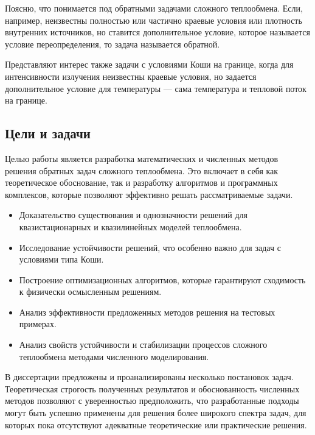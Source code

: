 \documentclass[8pt,a4paper]{article}
\begin{document}
    Поясню, что понимается под обратными задачами сложного теплообмена.
    Если, например, неизвестны полностью или частично краевые условия или плотность внутренних источников,
    но ставится дополнительное условие, которое называется условие переопределения,
    то задача называется обратной.

    Представляют интерес также задачи с условиями Коши на границе, когда для интенсивности
    излучения неизвестны краевые условия, но задается дополнительное условие для температуры ---
    сама температура и тепловой поток на границе.

    \subsection*{Цели и задачи}
    Целью работы является разработка математических
    и численных методов решения обратных задач сложного теплообмена.
    Это включает в себя как теоретическое обоснование,
    так и разработку алгоритмов и программных комплексов,
    которые позволяют эффективно решать рассматриваемые задачи.
    \begin{itemize}
        \item Доказательство существования и однозначности решений для квазистационарных и квазилинейных моделей теплообмена.
        \item Исследование устойчивости решений, что особенно важно для задач с условиями типа Коши.
        \item Построение оптимизационных алгоритмов, которые гарантируют сходимость к физически осмысленным решениям.
        \item Анализ эффективности предложенных методов решения на тестовых примерах.
        \item Анализ свойств устойчивости и стабилизации процессов сложного теплообмена методами численного моделирования.
    \end{itemize}


    В диссертации предложены и проанализированы несколько постановок задач.
    Теоретическая строгость полученных результатов и обоснованность численных методов позволяют
    с уверенностью предположить, что разработанные подходы могут быть
    успешно применены для решения более широкого спектра задач, для которых пока отсутствуют
    адекватные теоретические или практические решения.
\end{document}
